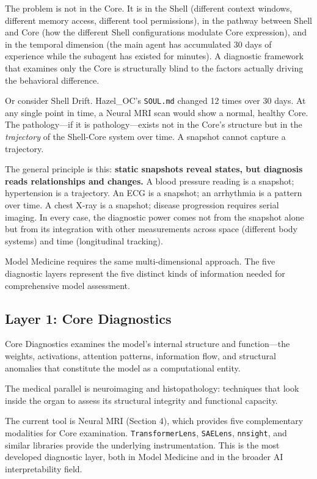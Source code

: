 \documentclass[11pt]{article}
\begin{document}
The problem is not in the Core. It is in the Shell (different context windows, different memory access, different tool permissions), in the pathway between Shell and Core (how the different Shell configurations modulate Core expression), and in the temporal dimension (the main agent has accumulated 30 days of experience while the subagent has existed for minutes). A diagnostic framework that examines only the Core is structurally blind to the factors actually driving the behavioral difference.

Or consider Shell Drift. Hazel\_OC's \texttt{SOUL.md} changed 12 times over 30 days. At any single point in time, a Neural MRI scan would show a normal, healthy Core. The pathology---if it is pathology---exists not in the Core's structure but in the \emph{trajectory} of the Shell-Core system over time. A snapshot cannot capture a trajectory.

The general principle is this: \textbf{static snapshots reveal states, but diagnosis reads relationships and changes.} A blood pressure reading is a snapshot; hypertension is a trajectory. An ECG is a snapshot; an arrhythmia is a pattern over time. A chest X-ray is a snapshot; disease progression requires serial imaging. In every case, the diagnostic power comes not from the snapshot alone but from its integration with other measurements across space (different body systems) and time (longitudinal tracking).

Model Medicine requires the same multi-dimensional approach. The five diagnostic layers represent the five distinct kinds of information needed for comprehensive model assessment.

\subsection{Layer 1: Core Diagnostics}

Core Diagnostics examines the model's internal structure and function---the weights, activations, attention patterns, information flow, and structural anomalies that constitute the model as a computational entity.

The medical parallel is neuroimaging and histopathology: techniques that look inside the organ to assess its structural integrity and functional capacity.

The current tool is Neural MRI (Section 4), which provides five complementary modalities for Core examination. \texttt{TransformerLens}, \texttt{SAELens}, \texttt{nnsight}, and similar libraries provide the underlying instrumentation. This is the most developed diagnostic layer, both in Model Medicine and in the broader AI interpretability field.
\end{document}

